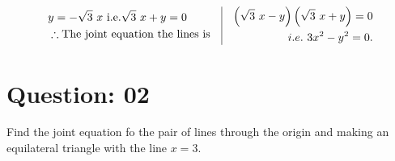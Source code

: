 \documentclass[17pt]{extarticle}
\begin{document}
\begin{fleqn}
\begin{equation} \nonumber
\begin{alignedat}{4}
& y= -\sqrt{3}\ x \ \text {i.e.} \sqrt{3}\ x + y = 0 \\
& \therefore \text {The joint equation the lines is}\\
\end{alignedat}
\quad
\vrule
\quad
\begin{alignedat}{4}
\left( \sqrt{3}\ x - y\right) \left( \sqrt{3}\ x + y\right) = 0 \\
i.e.\  3x^2 - y^2 = 0.
\end{alignedat}
\end{equation}


\section{Question: 02}
Find the joint equation fo the pair of lines through the origin and making an equilateral triangle with the line $x = 3.$



\end{fleqn}
\end{document}
